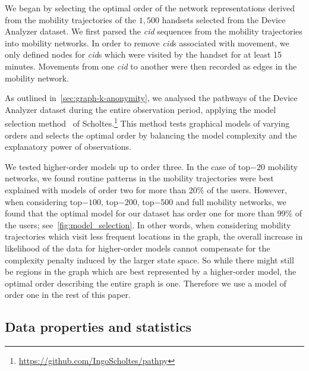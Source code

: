 We began by selecting the optimal order of the network representations derived from the mobility trajectories of the $1,500$ handsets selected from the Device Analyzer dataset.
We first parsed the \emph{cid} sequences from the mobility trajectories into mobility networks.
In order to remove \emph{cid}s associated with movement, we only defined nodes for \emph{cid}s which were visited by the handset for at least 15 minutes.
Movements from one \emph{cid} to another were then recorded as edges in the mobility network.

As outlined in~\cref{sec:graph-k-anonymity}, we analysed the pathways of the Device Analyzer dataset during the entire observation period, applying the model selection method~\cite{scholtes2017network} of Scholtes.\footnote{\url{https://github.com/IngoScholtes/pathpy}}
This method tests graphical models of varying orders and selects the optimal order by balancing the model complexity and the explanatory power of observations.

We tested higher-order models up to order three. In the case of top$-20$ mobility networks, we found routine patterns in the mobility trajectories were best explained with models of order two for more than 20$\%$ of the users. However, when considering top$-100$, top$-200$, top$-500$ and full mobility networks, we found that the optimal model for our dataset has order one for more than $ 99\% $ of the users; see~\cref{fig:model_selection}. In other words, when considering mobility trajectories which visit less frequent locations in the graph, the overall increase in likelihood of the data for higher-order models cannot compensate for the complexity penalty induced by the larger state space. So while there might still be regions in the graph which are best represented by a higher-order model, the optimal order describing the entire graph is one. Therefore we use a model of order one in the rest of this paper.

\subsection{Data properties and statistics} \label{sec:data-stats}

